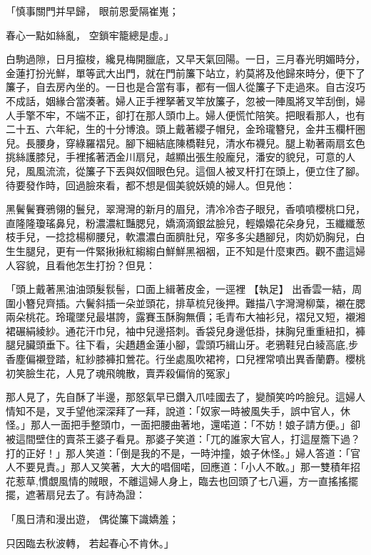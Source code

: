 「慎事關門并早歸，  眼前恩愛隔崔嵬；

春心一點如絲亂，  空鎖牢籠總是虛。」

白駒過隙，日月攛梭，纔見梅開臘底，又早天氣回陽。一日，三月春光明媚時分，金蓮打扮光鮮，單等武大出門，就在門前簾下站立，約莫將及他歸來時分，便下了簾子，自去房內坐的。一日也是合當有事，都有一個人從簾子下走過來。自古沒巧不成話，姻緣合當湊著。婦人正手裡拏著叉竿放簾子，忽被一陣風將叉竿刮倒，婦人手擎不牢，不端不正，卻打在那人頭巾上。婦人便慌忙陪笑。把眼看那人，也有二十五、六年紀，生的十分博浪。頭上戴著纓子帽兒，金玲瓏簪兒，金井玉欄杆圈兒。長腰身，穿綠羅褶兒。腳下細結底陳橋鞋兒，清水布襪兒。腿上勒著兩扇玄色挑絲護膝兒，手裡搖著洒金川扇兒，越顯出張生般龐兒，潘安的貌兒，可意的人兒，風風流流，從簾子下丟與奴個眼色兒。這個人被叉杆打在頭上，便立住了腳。待要發作時，回過臉來看，都不想是個美貌妖嬈的婦人。但見他：

黑鬢鬢賽鴉翎的鬟兒，翠灣灣的新月的眉兒，清冷冷杏子眼兒，香噴噴櫻桃口兒，直隆隆瓊瑤鼻兒，粉濃濃紅豔腮兒，嬌滴滴銀盆臉兒，輕嬝嬝花朵身兒，玉纖纖葱枝手兒，一捻捻楊柳腰兒，軟濃濃白面臍肚兒，窄多多尖趫腳兒，肉奶奶胸兒，白生生腿兒，更有一件緊揪揪紅縐縐白鮮鮮黑裀裀，正不知是什麼東西。觀不盡這婦人容貌，且看他怎生打扮？但見：

「頭上戴著黑油油頭髮䯼髻，口面上緝著皮金，一逕裡
【執足】
出香雲一結，周圍小簪兒齊插。六鬢斜插一朵並頭花，排草梳兒後押。難描八字灣灣柳葉，襯在腮兩朵桃花。玲瓏墜兒最堪誇，露賽玉酥胸無價；毛青布大袖衫兒，褶兒又短，襯湘裙碾絹綾紗。通花汗巾兒，袖中兒邊搭刺。香袋兒身邊低掛，抹胸兒重重紐扣，褲腿兒臟頭垂下。往下看，尖趫趫金蓮小腳，雲頭巧緝山牙。老鴉鞋兒白綾高底,步香塵偏襯登踏，紅紗膝褲扣鶯花。行坐處風吹裙袴，口兒裡常噴出異香蘭麝。櫻桃初笑臉生花，人見了魂飛魄散，賣弄殺偏俏的冤家」

那人見了，先自酥了半邊，那怒氣早已鑽入爪哇國去了，變顏笑吟吟臉兒。這婦人情知不是，叉手望他深深拜了一拜，說道：「奴家一時被風失手，誤中官人，休怪。」那人一面把手整頭巾，一面把腰曲著地，還喏道：「不妨！娘子請方便。」卻被這間壁住的賣茶王婆子看見。那婆子笑道：「兀的誰家大官人，打這屋簷下過？打的正好！」那人笑道：「倒是我的不是，一時沖撞，娘子休怪。」婦人答道：「官人不要見責。」那人又笑著，大大的唱個喏，回應道：「小人不敢。」那一雙積年招花惹草,慣覷風情的賊眼，不離這婦人身上，臨去也回頭了七八遍，方一直搖搖擺擺，遮著扇兒去了。有詩為證：

「風日清和漫出遊，  偶從簾下識嬌羞；

只因臨去秋波轉，  若起春心不肯休。」

